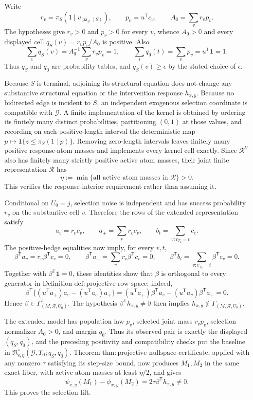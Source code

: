 Write
\[
 r_v=\pi_S(1\mid v_{\operatorname{pa}_{\mathcal G}(S)}),
 \qquad p_v=u^{\mathsf T}c_v,
 \qquad A_0=\sum_v r_vp_v.
\]
The hypotheses give \(r_v>0\) and \(p_v>0\) for every \(v\), whence \(A_0>0\) and every displayed cell \(q_S(v)=r_vp_v/A_0\) is positive.  Also
\[
 \sum_v q_S(v)=A_0^{-1}\sum_vr_vp_v=1,
 \qquad
 \sum_tq_0(t)=\sum_vp_v=u^{\mathsf T}\mathbf 1=1.
\]
Thus \(q_S\) and \(q_0\) are probability tables, and \(q_S(v)\geq\epsilon\) by the stated choice of \(\epsilon\).

Because \(S\) is terminal, adjoining its structural equation does not change any substantive structural equation or the intervention response \(h_{x,y}\).  Because no bidirected edge is incident to \(S\), an independent exogenous selection coordinate is compatible with \(\mathcal G\).  A finite implementation of the kernel is obtained by ordering its finitely many distinct probabilities, partitioning \((0,1)\) at those values, and recording on each positive-length interval the deterministic map \(p\mapsto\mathbf 1\{z\leq\pi_S(1\mid p)\}\).  Removing zero-length intervals leaves finitely many positive response-atom masses and implements every kernel cell exactly.  Since \(\mathcal R^{V}\) also has finitely many strictly positive active atom masses, their joint finite representation \(\mathcal R\) has
\[
 \eta:=\min\{\text{all active atom masses in }\mathcal R\}>0.
\]
This verifies the response-interior requirement rather than assuming it.

Conditional on \(U_0=j\), selection noise is independent and has success probability \(r_v\) on the substantive cell \(v\).  Therefore the rows of the extended representation satisfy
\[
 a_v=r_vc_v,\qquad
 a_+=\sum_vr_vc_v,\qquad
 b_t=\sum_{v:v_{T_0}=t}c_v.
\]
The positive-hedge equalities now imply, for every \(v,t\),
\[
 \beta^{\mathsf T}a_v=r_v\beta^{\mathsf T}c_v=0,\qquad
 \beta^{\mathsf T}a_+=\sum_vr_v\beta^{\mathsf T}c_v=0,\qquad
 \beta^{\mathsf T}b_t=\sum_{v:v_{T_0}=t}\beta^{\mathsf T}c_v=0.
\]
Together with \(\beta^{\mathsf T}\mathbf 1=0\), these identities show that \(\beta\) is orthogonal to every generator in Definition \(\mathrm{def{:}projective\text{-}row\text{-}space}\): indeed,
\[
 \beta^{\mathsf T}\bigl\{(u^{\mathsf T}a_+)a_v-(u^{\mathsf T}a_v)a_+\bigr\}
 =(u^{\mathsf T}a_+)\beta^{\mathsf T}a_v-(u^{\mathsf T}a_v)\beta^{\mathsf T}a_+=0.
\]
Hence \(\beta\in\Gamma_{(M,\mathcal R,U_0)}^{\perp}\).  The hypothesis \(\beta^{\mathsf T}h_{x,y}\neq0\) then implies \(h_{x,y}\notin\Gamma_{(M,\mathcal R,U_0)}\).

The extended model has population law \(p_v\), selected joint mass \(r_vp_v\), selection normalizer \(A_0>0\), and margin \(q_0\).  Thus its observed pair is exactly the displayed \((q_S,q_0)\), and the preceding positivity and compatibility checks put the baseline in \(\mathfrak R_{\epsilon,\eta}^{\circ}(\mathcal G,T_0;q_S,q_0)\).  Theorem \(\mathrm{thm{:}projective\text{-}nullspace\text{-}certificate}\), applied with any nonzero \(\tau\) satisfying its step-size bound, now produces \(M_1,M_2\) in the same exact fiber, with active atom masses at least \(\eta/2\), and gives
\[
 \psi_{x,y}(M_1)-\psi_{x,y}(M_2)
 =2\tau\beta^{\mathsf T}h_{x,y}\neq0.
\]
This proves the selection lift.